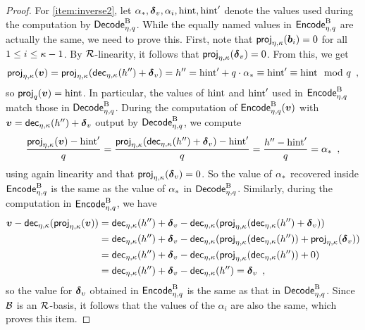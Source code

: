 \begin{proof}
\bigskip\noindent
For \autoref{item:inverse2}, let $\alpha_\qbasis, \deltav, \alpha_i, \hint, \hint'$ denote the values used during the computation by $\latdecode$.
While the equally named values in $\latencode$ are actually the same, we need to prove this.
First, note that $\projring(\vec{b}_i) = 0$ for all $1\leq i \leq \limbs-1$.
By $\ring$-linearity, it follows that $\projring(\deltav) = 0$. From this, we get
\[
 \projring(\vec{v}) = \projring(\decompring(h'') + \deltav) = h'' = \hint' + q\cdot \alpha_\qbasis \equiv \hint' \equiv \hint \mod q\enspace,
\]
so $\projmod{q}(\vec{v}) = \hint$. In particular, the values of $\hint$ and $\hint'$ used in $\latencode$ match those in $\latdecode$.
During the computation of $\latencode(\vec{v})$ with $\vec{v} = \decompring(h'')+\deltav$ output by $\latdecode$, we compute
\[
 \frac{\projring(\vec{v}) - \hint'}{q} = \frac{\projring(\decompring(h'')+\deltav)-\hint'}{q} = \frac{h''-\hint'}{q} = \alpha_\qbasis\enspace,
\]
using again linearity and that $\projring(\deltav) = 0$.
So the value of $\alpha_\qbasis$ recovered inside $\latencode$ is the same as the value of $\alpha_\qbasis$ in $\latdecode$.
Similarly, during the computation in $\latencode$, we have
\begin{align*}
 \vec{v}-\decompring(\projring(\vec{v})) 
 ={}& \decompring(h'') + \deltav - \decompring(\projring(\decompring(h'')+\deltav))\\
 ={}& \decompring(h'') + \deltav - \decompring(\projring(\decompring(h''))+\projring(\deltav))\\
 ={}& \decompring(h'') + \deltav - \decompring(\projring(\decompring(h''))+ 0)\\
 ={}&\decompring(h'') + \deltav - \decompring(h'') = \deltav\enspace,
\end{align*}
so the value for $\deltav$ obtained in $\latencode$ is the same as that in $\latdecode$.
Since $\kernelbasis$ is an $\ring$-basis, it follows that the values of the $\alpha_i$ are also the same, which proves this item.


\end{proof}

